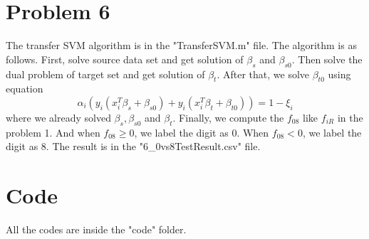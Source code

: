 \documentclass[11pt]{article}
\begin{document}
\section{Problem 6}
The transfer SVM algorithm is  in the "TransferSVM.m" file. The algorithm is as follows. First, solve source data set and get solution of $\beta_s$ and $\beta_{s0}$. Then solve the dual problem of target set and get solution of $\beta_{t}$. After that, we solve $\beta_{t0}$ using equation
\begin{equation}
\alpha_{i}(y_i(x_i^T\beta_s + \beta_{s0}) + y_i(x_i^T\beta_t + \beta_{t0})) = 1 - \xi_i
\end{equation}
where we already solved $\beta_s, \beta_{s0}$ and $\beta_t$. Finally, we compute the $f_{08}$ like $f_{iR}$ in the problem 1. And when $f_{08} \ge 0$, we label the digit as 0. When $f_{08} < 0$, we label the digit as 8.
The result is in the "6\_0vs8TestResult.csv" file.
\section{Code}
All the codes are inside the "code" folder.
\end{document}
